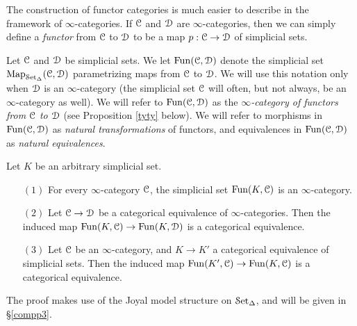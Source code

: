 \begin{1.2.7 Functors between higher cats}
The construction of functor categories is much easier to describe in the framework of $\infty$-categories. If $\calC$ and $\calD$ are
$\infty$-categories, then we can simply define a {\it functor} from
$\calC$ to $\calD$ to be a map $p: \calC \rightarrow \calD$ of simplicial sets.

\begin{notation}
Let $\calC$ and $\calD$ be simplicial sets. We let $\Fun(\calC, \calD)$ denote the
simplicial set $\bHom_{\sSet}(\calC, \calD)$ parametrizing maps from $\calC$ to $\calD$.
We will use this notation only when $\calD$ is an $\infty$-category (the simplicial set $\calC$ will often, but not always, be an $\infty$-category as well). We will refer to $\Fun(\calC, \calD)$ as the
{\it $\infty$-category of functors from $\calC$ to $\calD$} (see Proposition \ref{tyty} below).
We will refer to morphisms in $\Fun(\calC, \calD)$ as {\it natural transformations} of functors, and
equivalences in $\Fun(\calC, \calD)$ as {\it natural equivalences}.
\end{notation}

\begin{proposition}\label{tyty}
Let $K$ be an arbitrary simplicial set.
\begin{itemize}
\item[$(1)$] For every $\infty$-category $\calC$, the simplicial set $\Fun(K,\calC)$ is an $\infty$-category.

\item[$(2)$] Let $\calC \rightarrow \calD$ be a categorical equivalence of $\infty$-categories. Then the induced map $\Fun(K,\calC) \rightarrow \Fun(K,\calD)$ is a categorical equivalence.

\item[$(3)$] Let $\calC$ be an $\infty$-category, and $K \rightarrow K'$ a categorical equivalence of simplicial sets. Then the induced map $\Fun(K',\calC) \rightarrow \Fun(K,\calC)$ is a categorical equivalence.
\end{itemize}
\end{proposition}

The proof makes use of the Joyal model structure on $\sSet$, and will be given in \S \ref{compp3}.
\end{1.2.7 Functors between higher cats}
